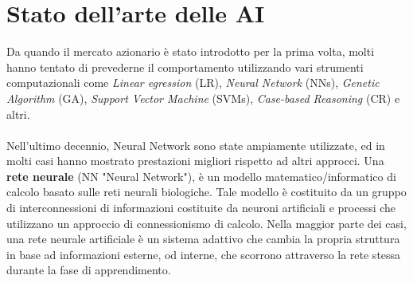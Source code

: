 \documentclass[a4paper,12pt]{report}
\begin{document}
\section{Stato dell'arte delle AI}
Da quando il mercato azionario è stato introdotto per la prima volta, molti hanno tentato di prevederne il comportamento utilizzando vari strumenti computazionali come \textit{Linear egression} (LR), \textit{Neural Network} (NNs), \textit{Genetic Algorithm} (GA), \textit{Support Vector Machine} (SVMs), \textit{Case-based Reasoning} (CR) e altri.\\~\\
Nell'ultimo decennio, Neural Network sono state ampiamente utilizzate, ed in molti casi hanno mostrato prestazioni migliori rispetto ad altri approcci. Una \textbf{rete neurale} (NN "Neural Network"), è un modello matematico/informatico di calcolo basato sulle reti neurali biologiche. Tale modello è costituito da un gruppo di interconnessioni di informazioni costituite da neuroni artificiali e processi che utilizzano un approccio di connessionismo di calcolo. Nella maggior parte dei casi, una rete neurale artificiale è un sistema adattivo che cambia la propria struttura in base ad informazioni esterne, od interne, che scorrono attraverso la rete stessa durante la fase di apprendimento.\\~\\
\end{document}
